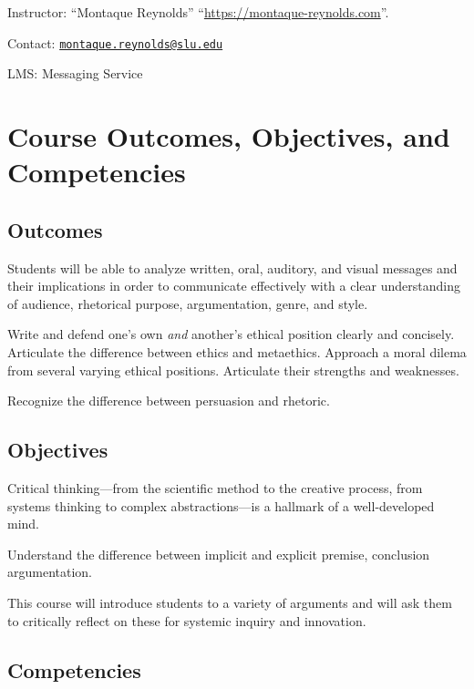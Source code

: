 \documentclass[
]{book}
\begin{document}
Instructor: ``Montaque Reynolds'' ``\url{https://montaque-reynolds.com}''.

Contact: \href{mailto:montaque.reynolds@slu.edu}{\nolinkurl{montaque.reynolds@slu.edu}}

LMS: Messaging Service

\hypertarget{course-outcomes-objectives-and-competencies}{%
\chapter{Course Outcomes, Objectives, and Competencies}\label{course-outcomes-objectives-and-competencies}}

\hypertarget{outcomes}{%
\section{Outcomes}\label{outcomes}}

Students will be able to analyze written, oral, auditory, and visual messages and their implications in order to communicate effectively with a clear understanding
of audience, rhetorical purpose, argumentation, genre, and style.

Write and defend one's own \emph{and} another's ethical position clearly and concisely. Articulate the difference between ethics and metaethics. Approach a moral dilema from several varying ethical positions. Articulate their strengths and weaknesses.

Recognize the difference between persuasion and rhetoric.

\hypertarget{objectives}{%
\section{Objectives}\label{objectives}}

Critical thinking---from the scientific method to the creative process, from
systems thinking to complex abstractions---is a hallmark of a well-developed
mind.

Understand the difference between implicit and explicit premise, conclusion argumentation.

This course will introduce students to a variety of arguments and will ask them to critically reflect on these for systemic inquiry
and innovation.

\hypertarget{competencies}{%
\section{Competencies}\label{competencies}}
\end{document}
